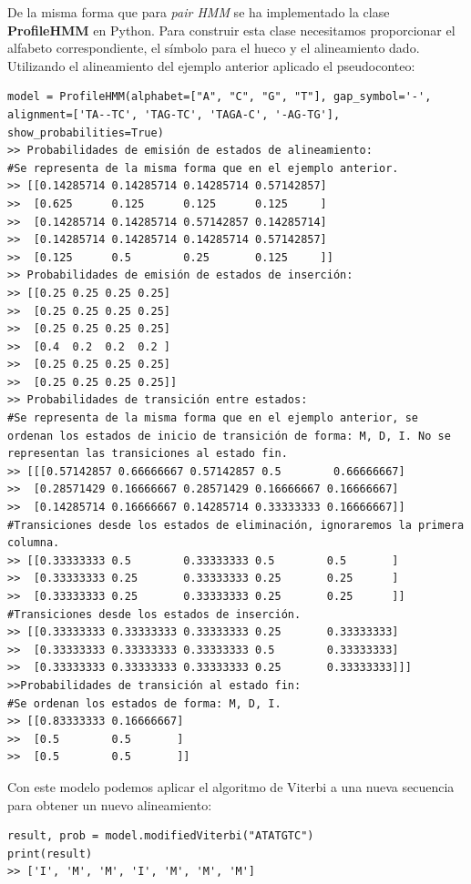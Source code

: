 \begin{exampleth}
De la misma forma que para \textit{pair HMM} se ha implementado la clase \textbf{ProfileHMM} en Python. Para construir esta clase necesitamos proporcionar el alfabeto correspondiente, el símbolo para el hueco y el alineamiento dado. Utilizando el alineamiento del ejemplo anterior aplicado el pseudoconteo:
\begin{verbatim}
model = ProfileHMM(alphabet=["A", "C", "G", "T"], gap_symbol='-', alignment=['TA--TC', 'TAG-TC', 'TAGA-C', '-AG-TG'], show_probabilities=True)
>> Probabilidades de emisión de estados de alineamiento:
#Se representa de la misma forma que en el ejemplo anterior.
>> [[0.14285714 0.14285714 0.14285714 0.57142857]
>>  [0.625      0.125      0.125      0.125     ]
>>  [0.14285714 0.14285714 0.57142857 0.14285714]
>>  [0.14285714 0.14285714 0.14285714 0.57142857]
>>  [0.125      0.5        0.25       0.125     ]]
>> Probabilidades de emisión de estados de inserción:
>> [[0.25 0.25 0.25 0.25]
>>  [0.25 0.25 0.25 0.25]
>>  [0.25 0.25 0.25 0.25]
>>  [0.4  0.2  0.2  0.2 ]
>>  [0.25 0.25 0.25 0.25]
>>  [0.25 0.25 0.25 0.25]]
>> Probabilidades de transición entre estados:
#Se representa de la misma forma que en el ejemplo anterior, se ordenan los estados de inicio de transición de forma: M, D, I. No se representan las transiciones al estado fin.
>> [[[0.57142857 0.66666667 0.57142857 0.5        0.66666667]
>>  [0.28571429 0.16666667 0.28571429 0.16666667 0.16666667]
>>  [0.14285714 0.16666667 0.14285714 0.33333333 0.16666667]]
#Transiciones desde los estados de eliminación, ignoraremos la primera columna.
>> [[0.33333333 0.5        0.33333333 0.5        0.5       ]
>>  [0.33333333 0.25       0.33333333 0.25       0.25      ]
>>  [0.33333333 0.25       0.33333333 0.25       0.25      ]]
#Transiciones desde los estados de inserción.
>> [[0.33333333 0.33333333 0.33333333 0.25       0.33333333]
>>  [0.33333333 0.33333333 0.33333333 0.5        0.33333333]
>>  [0.33333333 0.33333333 0.33333333 0.25       0.33333333]]]
>>Probabilidades de transición al estado fin:
#Se ordenan los estados de forma: M, D, I.
>> [[0.83333333 0.16666667]
>>  [0.5        0.5       ]
>>  [0.5        0.5       ]]
\end{verbatim}
Con este modelo podemos aplicar el algoritmo de Viterbi a una nueva secuencia para obtener un nuevo alineamiento:
\begin{verbatim}
result, prob = model.modifiedViterbi("ATATGTC")
print(result)
>> ['I', 'M', 'M', 'I', 'M', 'M', 'M']
\end{verbatim}

\end{exampleth}
